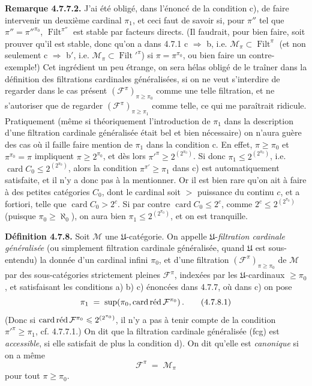 \documentclass[11pt]{article}
\newcommand{\msp}[1]{\marginpar{\footnotesize [#1]}}
\newcommand{\Filt}{\operatorname{Filt}}
\newcommand{\card}{\operatorname{card}}
\newcommand{\cardred}{\mathop{\mathrm{card}\,\textup{réd}}\nolimits}
\begin{document}
\noindent\msp{page 175}\textbf{Remarque 4.7.7.2.} J'ai été obligé, dans l'énoncé de la condition c), de faire intervenir un deuxième cardinal $\pi_1$, et ceci faut de savoir si, pour $\pi''$ tel que $\pi''=\pi''^{\pi_0}$, $\Filt^{\pi''}$ est stable par facteurs directs. (Il faudrait, pour bien faire, soit prouver qu'il est stable, donc qu'on a dans 4.7.1 c $\Longrightarrow$ b, i.e. $\mathcal{M}_\pi\subset\Filt^{\pi}$ (et non seulement c $\Longrightarrow$ b$'$, i.e. $\mathcal{M}_\pi\subset\Filt'^{\pi}$) si $\pi=\pi^{\pi_0}$, ou bien faire un contre-exemple!) Cet ingrédient un peu étrange, on sera hélas obligé de le traîner dans la définition des filtrations cardinales généralisées, si on ne veut s'interdire de regarder dans le cas présent $(\mathcal{F}^{\pi})_{\pi\geqslant\pi_0}$ comme une telle filtration, et ne s'autoriser que de regarder $(\mathcal{F}^{\pi})_{\pi\geqslant\pi_1}$ comme telle, ce qui me paraîtrait ridicule. Pratiquement (même si théoriquement l'introduction de $\pi_1$ dans la description d'une filtration cardinale généralisée était bel et bien nécessaire) on n'aura guère des cas où il faille faire mention de $\pi_1$ dans la condition c. En effet, $\pi\geqslant\pi_0$ et $\pi^{\pi_0}=\pi$ impliquent $\pi\geqslant 2^{\pi_0}$, et dès lors $\pi'^{\pi}\geqslant 2^{(2^{\pi_0})}$. Si donc $\pi_1\leqslant 2^{(2^{\pi_0})}$, i.e. $\card C_0\leqslant 2^{(2^{\pi_0})}$, alors la condition $\pi^{\pi'}\geqslant\pi_1$ dans c) est automatiquement satisfaite, et il n'y a donc pas à la mentionner. Or il est bien rare qu'on ait à faire à des petites catégories $C_0$, dont le cardinal soit $>$ puissance %
\msp{page 176}
du continu $c$, et a fortiori, telle que $\card C_0 > 2^{c}$. Si par contre $\card C_0\leqslant 2^{c}$, comme $2^{c}\leqslant 2^{(2^{\pi_0})}$ (puisque $\pi_0\geqslant\aleph_0$), on aura bien $\pi_1\leqslant 2^{(2^{\pi_0})}$, et on est tranquille.

\textbf{Définition 4.7.8.} Soit $\mathcal{M}$ une $\mathfrak{U}$-catégorie. On appelle $\mathfrak{U}$-\textit{filtration cardinale généralisée} (ou simplement filtration cardinale généralisée, quand $\mathfrak{U}$ est sous-entendu) la donnée d'un cardinal infini $\pi_0$, et d'une filtration $(\mathcal{F}^{\pi})_{\pi\geqslant\pi_0}$ de $\mathcal{M}$ par des sous-catégories strictement pleines $\mathcal{F}^{\pi}$, indexées par les $\mathfrak{U}$-cardinaux $\geqslant\pi_0$, et satisfaisant les conditions a) b) c) énoncées dans 4.7.7, où dans c) on pose
\[
\pi_1 \;=\; \sup(\pi_0,\cardred\mathcal{F}^{\pi_0}) \, . \tag*{(4.7.8.1)}
\]
(Donc si $\cardred\mathcal{F}^{\pi_0}\leqslant 2^{(2^{\pi_0})}$, il n'y a pas à tenir compte de la condition $\pi'^{\pi}\geqslant\pi_1$, cf. 4.7.7.1.) On dit que la filtration cardinale généralisée (fcg) est \textit{accessible}, si elle satisfait de plus la condition d). On dit qu'elle est \textit{canonique} si on a même
\[
\mathcal{F}^{\pi} \;=\; \mathcal{M}_{\pi} \tag*{(4.7.8.2)}
\]
pour tout $\pi\geqslant\pi_0$.
\end{document}
